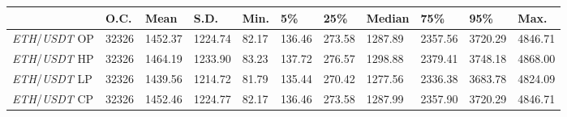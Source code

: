 \begin{tabular}{lllllllllll}
\toprule
 & \textbf{O.C.} & \textbf{Mean} & \textbf{S.D.} & \textbf{Min.} & \textbf{5\%} & \textbf{25\%} & \textbf{Median} & \textbf{75\%} & \textbf{95\%} & \textbf{Max.} \\
\midrule
\emph{ETH}/\emph{USDT} OP & 32326 & 1452.37 & 1224.74 & 82.17 & 136.46 & 273.58 & 1287.89 & 2357.56 & 3720.29 & 4846.71 \\
\emph{ETH}/\emph{USDT} HP & 32326 & 1464.19 & 1233.90 & 83.23 & 137.72 & 276.57 & 1298.88 & 2379.41 & 3748.18 & 4868.00 \\
\emph{ETH}/\emph{USDT} LP & 32326 & 1439.56 & 1214.72 & 81.79 & 135.44 & 270.42 & 1277.56 & 2336.38 & 3683.78 & 4824.09 \\
\emph{ETH}/\emph{USDT} CP & 32326 & 1452.46 & 1224.77 & 82.17 & 136.46 & 273.58 & 1287.99 & 2357.90 & 3720.29 & 4846.71 \\
\bottomrule
\end{tabular}
